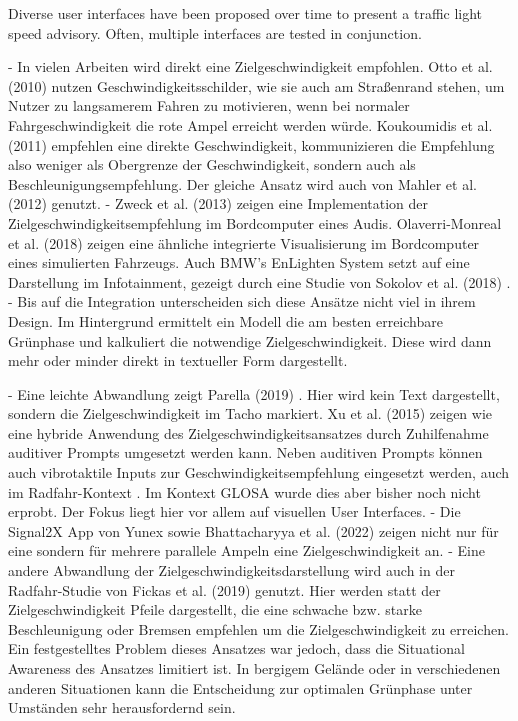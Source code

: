 Diverse user interfaces have been proposed over time to present a traffic light speed advisory. Often, multiple interfaces are tested in conjunction.

- In vielen Arbeiten wird direkt eine Zielgeschwindigkeit empfohlen. Otto et al. (2010) \cite{otto_operating_2010} nutzen Geschwindigkeitsschilder, wie sie auch am Straßenrand stehen, um Nutzer zu langsamerem Fahren zu motivieren, wenn bei normaler Fahrgeschwindigkeit die rote Ampel erreicht werden würde. Koukoumidis et al. (2011) \cite{koukoumidis_signalguru_2011, koukoumidis_leveraging_2012} empfehlen eine direkte Geschwindigkeit, kommunizieren die Empfehlung also weniger als Obergrenze der Geschwindigkeit, sondern auch als Beschleunigungsempfehlung. Der gleiche Ansatz wird auch von Mahler et al. (2012) \cite{mahler_reducing_2012} genutzt.
- Zweck et al. (2013) \cite{zweck_traffic_2013} zeigen eine Implementation der Zielgeschwindigkeitsempfehlung im Bordcomputer eines Audis. Olaverri-Monreal et al. (2018) \cite{olaverri-monreal_implementation_2018} zeigen eine ähnliche integrierte Visualisierung im Bordcomputer eines simulierten Fahrzeugs. Auch BMW's EnLighten System setzt auf eine Darstellung im Infotainment, gezeigt durch eine Studie von Sokolov et al. (2018) \cite{sokolov_effects_2018}. 
- Bis auf die Integration unterscheiden sich diese Ansätze nicht viel in ihrem Design. Im Hintergrund ermittelt ein Modell die am besten erreichbare Grünphase und kalkuliert die notwendige Zielgeschwindigkeit. Diese wird dann mehr oder minder direkt in textueller Form dargestellt.

- Eine leichte Abwandlung zeigt Parella (2019) \cite{marias_parella_design_2019}. Hier wird kein Text dargestellt, sondern die Zielgeschwindigkeit im Tacho markiert. Xu et al. (2015) \cite{xu_bb_2015} zeigen wie eine hybride Anwendung des Zielgeschwindigkeitsansatzes durch Zuhilfenahme auditiver Prompts umgesetzt werden kann. Neben auditiven Prompts können auch vibrotaktile Inputs zur Geschwindigkeitsempfehlung eingesetzt werden, auch im Radfahr-Kontext \cite{cespedes_group_2019}. Im Kontext GLOSA wurde dies aber bisher noch nicht erprobt. Der Fokus liegt hier vor allem auf visuellen User Interfaces.
- Die Signal2X App von Yunex \cite{yunex_traffic_v2x-kommunikation_2023} sowie Bhattacharyya et al. (2022) \cite{bhattacharyya_assessing_2022} zeigen nicht nur für eine sondern für mehrere parallele Ampeln eine Zielgeschwindigkeit an.
- Eine andere Abwandlung der Zielgeschwindigkeitsdarstellung wird auch in der Radfahr-Studie von Fickas et al. (2019) \cite{fickas_fast_2019} genutzt. Hier werden statt der Zielgeschwindigkeit Pfeile dargestellt, die eine schwache bzw. starke Beschleunigung oder Bremsen empfehlen um die Zielgeschwindigkeit zu erreichen. Ein festgestelltes Problem dieses Ansatzes war jedoch, dass die Situational Awareness des Ansatzes limitiert ist. In bergigem Gelände oder in verschiedenen anderen Situationen kann die Entscheidung zur optimalen Grünphase unter Umständen sehr herausfordernd sein.

